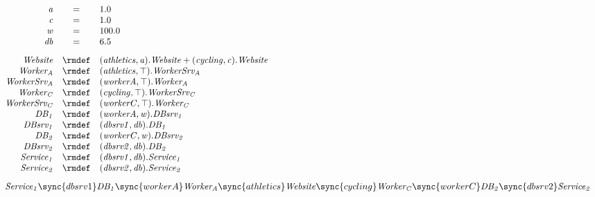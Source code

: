\begin{displaymath}
	\begin{array}{rcl}
		\mathit{a} & = & 1.0\\
		\mathit{c} & = & 1.0\\
		\mathit{w} & = & 100.0\\
		\mathit{db} & = & 6.5\\
[2.0ex]		\mathit{Website} & \rmdef & (\mathit{athletics},\mathit{a}).\mathit{Website}+(\mathit{cycling},\mathit{c}).\mathit{Website}\\
		\mathit{Worker_A} & \rmdef & (\mathit{athletics},\top).\mathit{WorkerSrv_A}\\
		\mathit{WorkerSrv_A} & \rmdef & (\mathit{workerA},\top).\mathit{Worker_A}\\
		\mathit{Worker_C} & \rmdef & (\mathit{cycling},\top).\mathit{WorkerSrv_C}\\
		\mathit{WorkerSrv_C} & \rmdef & (\mathit{workerC},\top).\mathit{Worker_C}\\
		\mathit{DB_1} & \rmdef & (\mathit{workerA},\mathit{w}).\mathit{DBsrv_1}\\
		\mathit{DBsrv_1} & \rmdef & (\mathit{dbsrv1},\mathit{db}).\mathit{DB_1}\\
		\mathit{DB_2} & \rmdef & (\mathit{workerC},\mathit{w}).\mathit{DBsrv_2}\\
		\mathit{DBsrv_2} & \rmdef & (\mathit{dbsrv2},\mathit{db}).\mathit{DB_2}\\
		\mathit{Service_1} & \rmdef & (\mathit{dbsrv1},\mathit{db}).\mathit{Service_1}\\
		\mathit{Service_2} & \rmdef & (\mathit{dbsrv2},\mathit{db}).\mathit{Service_2}\\
[2.0ex]		\multicolumn{3}{l}{\mathit{Service_1}\sync{dbsrv1}\mathit{DB_1}\sync{workerA}\mathit{Worker_A}\sync{athletics}\mathit{Website}\sync{cycling}\mathit{Worker_C}\sync{workerC}\mathit{DB_2}\sync{dbsrv2}\mathit{Service_2}}\\
[2.0ex]	\end{array}
\end{displaymath}
